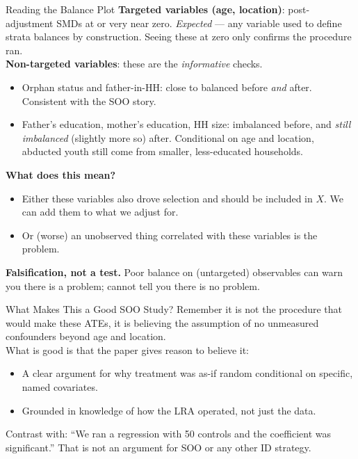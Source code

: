\documentclass[xcolor=dvipsnames]{beamer}
\begin{document}
\begin{frame}{Reading the Balance Plot}
\footnotesize
{} \textbf{Targeted variables (age, location)}: post-adjustment SMDs at or very near zero.  \textit{Expected} --- any variable used to define strata balances by construction.  Seeing these at zero only confirms the procedure ran.\\

\medskip
{} \textbf{Non-targeted variables}: these are the \textit{informative} checks.
\begin{itemize}
\footnotesize
\item Orphan status and father-in-HH: close to balanced before \textit{and} after.  Consistent with the SOO story.
\item Father's education, mother's education, HH size: imbalanced before, and \textit{still imbalanced} (slightly more so) after.  Conditional on age and location, abducted youth still come from smaller, less-educated households.
\end{itemize}

\medskip
{} \textbf{What does this mean?}
\begin{itemize}
\footnotesize
\item Either these variables also drove selection and should be included in $X$. We can add them to what we adjust for.
\item Or (worse) an unobserved thing correlated with these variables is the problem. 
\end{itemize}

\medskip
{} \textbf{Falsification, not a test.}  Poor balance on (untargeted)  observables can warn you there is a problem; cannot tell you there is no problem.
\end{frame}


\begin{frame}{What Makes This a Good SOO Study?}
\small
{} Remember it is not the procedure that would make these ATEs, it is believing the assumption of no unmeasured confounders beyond age and location.\\
\medskip
{} What is good is that the paper gives reason to believe it: \\
\begin{itemize}
\item<2-> A clear argument for why treatment was as-if random conditional on specific, named covariates.
\medskip
\item<3-> Grounded in knowledge of how the LRA operated, not just the data.
\end{itemize}

\bigskip
{} Contrast with: ``We ran a regression with 50 controls and the coefficient was significant.''  That is not an argument for SOO or any other ID strategy.
\end{frame}
\end{document}

